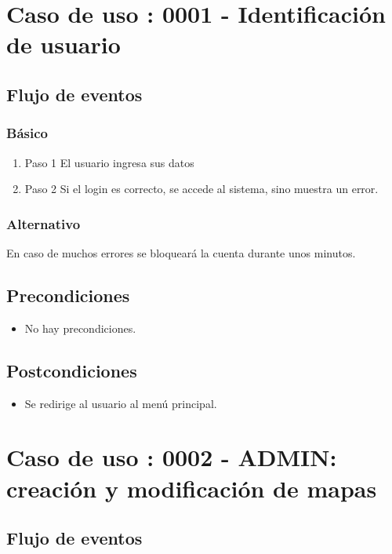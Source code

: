 \section{Caso de uso : 0001 - Identificación de usuario}\label{sec:uc0}



\subsection{Flujo de eventos}

\subsubsection{Básico}

\begin{enumerate}
\item Paso 1
El usuario ingresa sus datos
\item Paso 2
Si el login es correcto, se accede al sistema, sino muestra un error.
\end{enumerate}

  \subsubsection{Alternativo}
En caso de muchos errores se bloqueará la cuenta durante unos minutos.
\subsection{Precondiciones}
\begin{itemize}
\item No hay precondiciones.
\end{itemize}
\subsection{Postcondiciones}
\begin{itemize}
\item Se redirige al usuario al menú principal.
\end{itemize}
\section{Caso de uso : 0002 - ADMIN: creación y modificación de mapas}\label{sec:uc0}



\subsection{Flujo de eventos}

